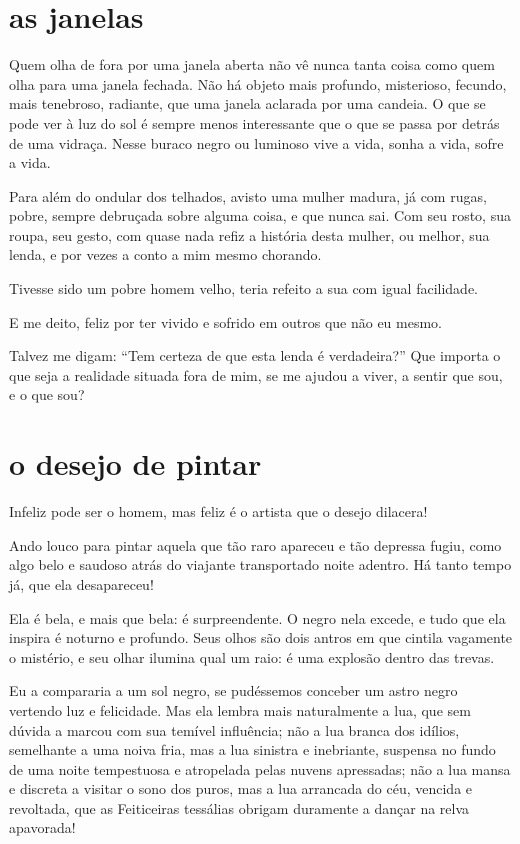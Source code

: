 \quebra\section[As janelas]{as janelas}

Quem olha de fora por uma janela aberta não vê nunca
tanta coisa como quem olha para uma janela fechada. Não há objeto
mais profundo, misterioso, fecundo, mais tenebroso,
radiante, que uma janela aclarada por uma candeia. O que se pode ver
à luz do sol é sempre menos interessante que o que se passa por
detrás de uma vidraça. Nesse buraco negro ou luminoso vive a vida,
sonha a vida, sofre a vida.

Para além do ondular dos telhados, avisto uma mulher madura, já com
rugas, pobre, sempre debruçada sobre alguma coisa, e que nunca sai. Com
seu rosto, sua roupa, seu gesto, com quase nada refiz a
história desta mulher, ou melhor, sua lenda, e por vezes a conto a mim
mesmo chorando.

Tivesse sido um pobre homem velho, teria refeito a sua com igual
facilidade.

E me deito, feliz por ter vivido e sofrido em outros que não eu mesmo.

Talvez me digam: “Tem certeza de que esta lenda é
verdadeira?'' Que importa o que seja a realidade
situada fora de mim, se me ajudou a viver, a sentir que sou, e o que
sou?

\quebra\section[O desejo de pintar]{o desejo de pintar}

Infeliz pode ser o homem, mas feliz é o artista que o desejo dilacera!

Ando louco para pintar aquela que tão raro apareceu e tão
depressa fugiu, como algo belo e saudoso atrás do viajante transportado
noite adentro. Há tanto tempo já, que ela desapareceu!

Ela é bela, e mais que bela: é surpreendente. O negro nela excede, e
tudo que ela inspira é noturno e profundo. Seus olhos são dois antros
em que cintila vagamente o mistério, e seu olhar ilumina qual um raio: é
uma explosão dentro das trevas.

Eu a compararia a um sol negro, se pudéssemos conceber um astro negro
vertendo luz e felicidade. Mas ela lembra mais naturalmente a
lua, que sem dúvida a marcou com sua temível influência; não a lua
branca dos idílios, semelhante a uma noiva fria, mas a lua
sinistra e inebriante, suspensa no fundo de uma noite tempestuosa e
atropelada pelas nuvens apressadas; não a lua mansa e discreta a
visitar o sono dos puros, mas a lua arrancada do céu, vencida e
revoltada, que as Feiticeiras tessálias obrigam duramente a dançar
na relva apavorada!

